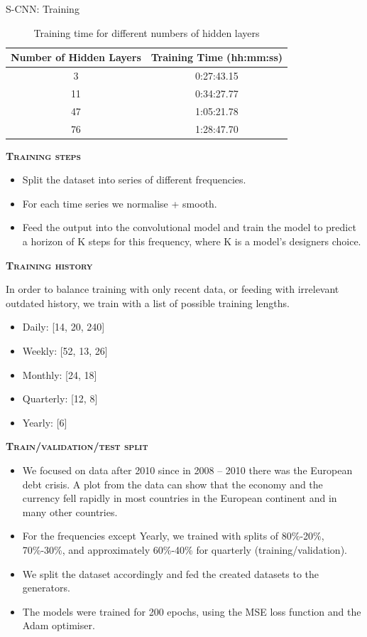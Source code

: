 \documentclass[aspectratio=169, 12pt]{beamer}
\begin{document}
\begin{frame}[allowframebreaks]{S-CNN: Training}
\begin{table}[htbp]
\centering
\caption{Training time for different numbers of hidden layers}
\begin{tabular}{cc}
\toprule
Number of Hidden Layers & Training Time (hh:mm:ss) \\
\midrule
3 & 0:27:43.15 \\
11 & 0:34:27.77 \\
47 & 1:05:21.78 \\
76 & 1:28:47.70 \\
\bottomrule
\end{tabular}
\end{table}
\begin{center}
    \textsc{\textbf{Training steps}}
\end{center}
\begin{itemize}
\item Split the dataset into series of different frequencies.
\item For each time series we normalise + smooth.
\item Feed the output into the convolutional model and train the model to predict a horizon of K steps for this frequency, where K is a model’s designers choice.
\end{itemize}
\newpage
\begin{center}
    \textsc{\textbf{Training history}}
\end{center}
In order to balance training with only recent data, or feeding with irrelevant outdated history, we train with a list of possible training lengths.
\begin{itemize}
    \item Daily: [14, 20, 240]
    \item Weekly: [52, 13, 26]
    \item Monthly: [24, 18]
    \item Quarterly: [12, 8]
    \item Yearly: [6]
\end{itemize}
\newpage
\begin{center}
    \textsc{\textbf{Train/validation/test split}}
\end{center}
\begin{itemize}
    \item We focused on data after 2010 since in 2008 – 2010 there was the European debt crisis. A plot from the data can show that the economy and the currency fell rapidly in most countries in the European continent and in many other countries.
    \item For the frequencies except Yearly, we trained with splits of 80\%-20\%, 70\%-30\%, and approximately 60\%-40\% for quarterly (training/validation).
    \item We split the dataset accordingly and fed the created datasets to the generators.
    \item The models were trained for 200 epochs, using the MSE loss function and the Adam optimiser.
\end{itemize}

\end{frame}
\end{document}
